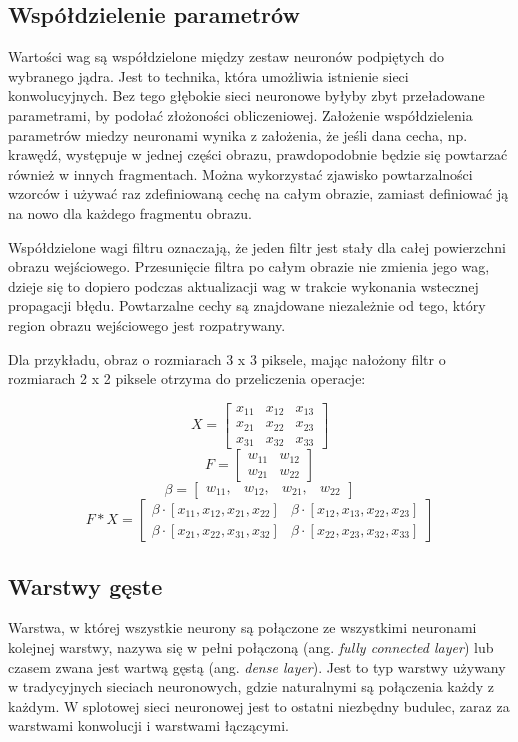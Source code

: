 \documentclass[12pt,a4paper,twoside,titlepage,openright]{book}
\begin{document}
\subsection{Współdzielenie parametrów}
Wartości wag są współdzielone między zestaw neuronów podpiętych do wybranego jądra. Jest to technika, która umożliwia istnienie sieci konwolucyjnych. Bez tego głębokie sieci neuronowe byłyby zbyt przeładowane parametrami, by podołać złożoności obliczeniowej. Założenie współdzielenia parametrów miedzy neuronami wynika z założenia, że jeśli dana cecha, np. krawędź, występuje w jednej części obrazu, prawdopodobnie będzie się powtarzać również w innych fragmentach. Można wykorzystać zjawisko powtarzalności wzorców i używać raz zdefiniowaną cechę na całym obrazie, zamiast definiować ją na nowo dla każdego fragmentu obrazu.

Współdzielone wagi filtru oznaczają, że jeden filtr jest stały dla całej powierzchni obrazu wejściowego. Przesunięcie filtra po całym obrazie nie zmienia jego wag, dzieje się to dopiero podczas aktualizacji wag w trakcie wykonania wstecznej propagacji błędu. Powtarzalne cechy są znajdowane niezależnie od tego, który region obrazu wejściowego jest rozpatrywany.

Dla przykładu, obraz o rozmiarach 3 x 3 piksele, mając nałożony filtr o rozmiarach 2 x 2 piksele otrzyma do przeliczenia operacje:

 $$X = 
 \begin{bmatrix} 
 x_{11} & x_{12} & x_{13}  \\ x_{21} & x_{22} & x_{23} \\x_{31} & x_{32} & x_{33} 
 \end{bmatrix}
$$
$$F =  
 \begin{bmatrix} 
 w_{11} & w_{12} \\ w_{21} & w_{22} 
 \end{bmatrix}
$$
 $$\beta = 
 \begin{bmatrix} 
 w_{11}, & w_{12}, & w_{21}, & w_{22} 
 \end{bmatrix}
$$
 $$F * X =  
 \begin{bmatrix}  
\beta \cdot [x_{11}, x_{12}, x_{21}, x_{22}] & \beta \cdot [x_{12}, x_{13}, x_{22}, x_{23}] \\
\beta \cdot [x_{21}, x_{22}, x_{31}, x_{32}] & \beta \cdot [x_{22}, x_{23}, x_{32}, x_{33}] 
 \end{bmatrix}
$$

\subsection{Warstwy gęste}
Warstwa, w której wszystkie neurony są połączone ze wszystkimi neuronami kolejnej warstwy, nazywa się w pełni połączoną (ang. \textit{fully connected layer}) lub czasem zwana jest wartwą gęstą (ang. \textit{dense layer}). Jest to typ warstwy używany w tradycyjnych sieciach neuronowych, gdzie naturalnymi są połączenia każdy z każdym. W splotowej sieci neuronowej jest to ostatni niezbędny budulec, zaraz za warstwami konwolucji i warstwami łączącymi.
\end{document}
